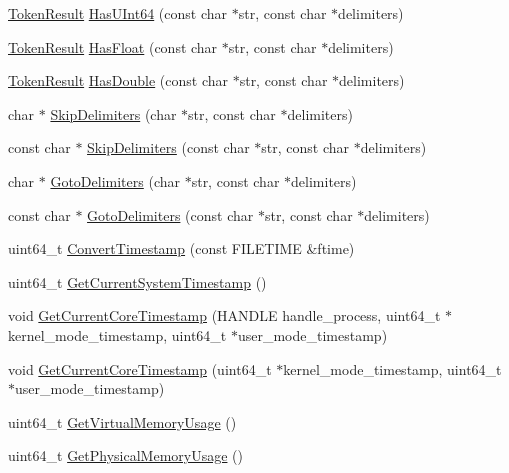 \begin{DoxyCompactItemize}
\item 
\hyperlink{namespacemage_a2178ba2411db5912f41b2e7698c2037d}{Token\+Result} \hyperlink{namespacemage_a49b54d6a4244d71dc63237ead3a6307e}{Has\+U\+Int64} (const char $\ast$str, const char $\ast$delimiters)
\item 
\hyperlink{namespacemage_a2178ba2411db5912f41b2e7698c2037d}{Token\+Result} \hyperlink{namespacemage_a8ebb1c7757b2869a4d3dc3c60c3a836d}{Has\+Float} (const char $\ast$str, const char $\ast$delimiters)
\item 
\hyperlink{namespacemage_a2178ba2411db5912f41b2e7698c2037d}{Token\+Result} \hyperlink{namespacemage_ac039d6b5a481b26e7440672a75ad70df}{Has\+Double} (const char $\ast$str, const char $\ast$delimiters)
\item 
char $\ast$ \hyperlink{namespacemage_a0a49375006b3808200d86271f62dbbc2}{Skip\+Delimiters} (char $\ast$str, const char $\ast$delimiters)
\item 
const char $\ast$ \hyperlink{namespacemage_acd903800f144d88982aa559730b9a165}{Skip\+Delimiters} (const char $\ast$str, const char $\ast$delimiters)
\item 
char $\ast$ \hyperlink{namespacemage_a1f8c73ddfbe8a370be1800627136b2ca}{Goto\+Delimiters} (char $\ast$str, const char $\ast$delimiters)
\item 
const char $\ast$ \hyperlink{namespacemage_a3cbc104feb30a9abd8dcec1a77b918b0}{Goto\+Delimiters} (const char $\ast$str, const char $\ast$delimiters)
\item 
uint64\+\_\+t \hyperlink{namespacemage_a75f2f48306b962f530412769c6187aa5}{Convert\+Timestamp} (const F\+I\+L\+E\+T\+I\+ME \&ftime)
\item 
uint64\+\_\+t \hyperlink{namespacemage_aeea6f9a0100878bc2403d41ea6d5ac08}{Get\+Current\+System\+Timestamp} ()
\item 
void \hyperlink{namespacemage_a1c830fb0bc11bc1f71585a4dad01c1db}{Get\+Current\+Core\+Timestamp} (H\+A\+N\+D\+LE handle\+\_\+process, uint64\+\_\+t $\ast$kernel\+\_\+mode\+\_\+timestamp, uint64\+\_\+t $\ast$user\+\_\+mode\+\_\+timestamp)
\item 
void \hyperlink{namespacemage_ab13eacb27032f7167e735b0f4f6960fc}{Get\+Current\+Core\+Timestamp} (uint64\+\_\+t $\ast$kernel\+\_\+mode\+\_\+timestamp, uint64\+\_\+t $\ast$user\+\_\+mode\+\_\+timestamp)
\item 
uint64\+\_\+t \hyperlink{namespacemage_abc4bbe41e0b34bb80ff8994ec09bd2bf}{Get\+Virtual\+Memory\+Usage} ()
\item 
uint64\+\_\+t \hyperlink{namespacemage_ad86bf56ff188b6519ddc0f0df8eaac20}{Get\+Physical\+Memory\+Usage} ()

\end{DoxyCompactItemize}
